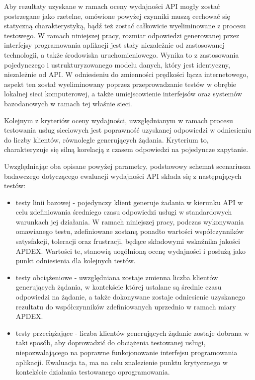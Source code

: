 Aby rezultaty uzyskane w ramach oceny wydajności API mogły zostać postrzegane jako rzetelne, omówione powyżej czynniki muszą cechować się statyczną charakterystyką, bądź też zostać całkowicie wyeliminowane z procesu testowego. W ramach niniejszej pracy, rozmiar odpowiedzi generowanej przez interfejsy programowania aplikacji jest stały niezależnie od zastosowanej technologii, a także środowiska uruchomieniowego. Wynika to z zastosowania pojedynczego i ustrukturyzowanego modelu danych, który jest identyczny, niezależnie od API. W odniesieniu do zmienności prędkości łącza internetowego, aspekt ten został wyeliminowany poprzez przeprowadzanie testów w obrębie lokalnej sieci komputerowej, a także umiejscowienie interfejsów oraz systemów bazodanowych w ramach tej właśnie sieci.

Kolejnym z kryteriów oceny wydajności, uwzględnianym w ramach procesu testowania usług sieciowych jest poprawność uzyskanej odpowiedzi w odniesieniu do liczby klientów, równolegle generujących żądania. Kryterium to, charakteryzuje się silną korelacją z czasem odpowiedzi na pojedyncze zapytanie.

Uwzględniając oba opisane powyżej parametry, podstawowy schemat scenariusza badawczego dotyczącego ewaluacji wydajności API składa się z następujących testów:
\begin{itemize}
    \item testy linii bazowej - pojedynczy klient generuje żadania w kierunku API w celu zdefiniowania średniego czasu odpowiedzi usługi w standardowych warunkach jej działania. W ramach niniejszej pracy, podczas wykonywania omawianego testu, zdefiniowane zostaną ponadto wartości współczynników satysfakcji, toleracji oraz frustracji, będące składowymi wskaźnika jakości APDEX. Wartości te, stanowią uogólnioną ocenę wydajności i posłużą jako punkt odniesienia dla kolejnych testów.
    \item testy obciążeniowe - uwzględniana zostaje zmienna liczba klientów generujących żądania, w kontekście której ustalane są średnie czasu odpowiedzi na żądanie, a także dokonywane zostaje odniesienie uzyskanego rezultatu do współczynników zdefiniowanych uprzednio w ramach miary APDEX.
    \item testy przeciążające - liczba klientów generujących żądanie zostaje dobrana w taki sposób, aby doprowadzić do obciążenia testowanej usługi, niepozwalającego na poprawne funkcjonowanie interfejsu programowania aplikacji. Ewaluacja ta, ma na celu znalezienie punktu krytycznego w kontekście działania testowanego oprogramowania.
\end{itemize}

